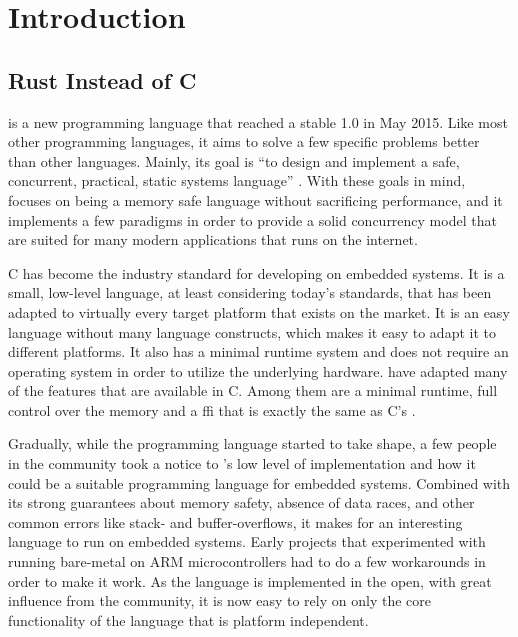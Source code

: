 
\chapter{Introduction}
\label{chap:intro}


\section{Rust Instead of C} %
\label{sec:intro:rust_as_replacement_to_c}

{\rust} is a new programming language that reached a stable 1.0 in May 2015.
Like most other programming languages, it aims to solve a few specific problems better than other languages.
Mainly, its goal is ``to design and implement a safe, concurrent, practical, static systems language'' \cite{web:rust_faq}.
With these goals in mind, {\rust} focuses on being a memory safe language without sacrificing performance, and it implements a few paradigms in order to provide a solid concurrency model that are suited for many modern applications that runs on the internet.

C has become the industry standard for developing on embedded systems.
It is a small, low-level language, at least considering today's standards, that has been adapted to virtually every target platform that exists on the market.
It is an easy language without many language constructs, which makes it easy to adapt it to different platforms.
It also has a minimal runtime system and does not require an operating system in order to utilize the underlying hardware.
{\rust} have adapted many of the features that are available in C.
Among them are a minimal runtime, full control over the memory and a \gls{ffi} that is exactly the same as C's \cite{web:rust_once_run_everywhere}.

Gradually, while the {\rust} programming language started to take shape, a few people in the community took a notice to {\rust}'s low level of implementation and how it could be a suitable programming language for embedded systems.
Combined with its strong guarantees about memory safety, absence of data races, and other common errors like stack- and buffer-overflows, it makes for an interesting language to run on embedded systems.
Early projects that experimented with running {\rust} bare-metal on ARM microcontrollers had to do a few workarounds in order to make it work.
As the language is implemented in the open, with great influence from the community, it is now easy to rely on only the core functionality of the language that is platform independent.

